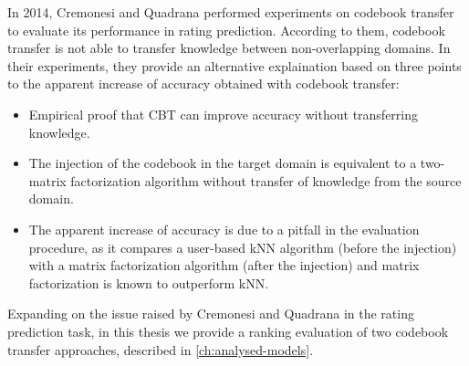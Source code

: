 In 2014, Cremonesi and Quadrana \cite{10.1145/2645710.2645769} performed experiments on codebook transfer to evaluate its performance in rating prediction. According to them, codebook transfer is not able to transfer knowledge between non-overlapping domains. In their experiments, they provide an alternative explaination based on three points to the apparent increase of accuracy obtained with codebook transfer:
\begin{itemize}
\item Empirical proof that CBT can improve accuracy without transferring knowledge.
\item The injection of the codebook in the target domain is equivalent to a two-matrix factorization algorithm without transfer of knowledge from the source domain.
\item The apparent increase of accuracy is due to a pitfall in the evaluation procedure, as it compares a user-based kNN algorithm (before the injection) with a matrix factorization algorithm (after the injection) and matrix factorization is known to outperform kNN.
\end{itemize}
Expanding on the issue raised by Cremonesi and Quadrana in the rating prediction task, in this thesis we provide a ranking evaluation of two codebook transfer approaches, described in \autoref{ch:analysed-models}.